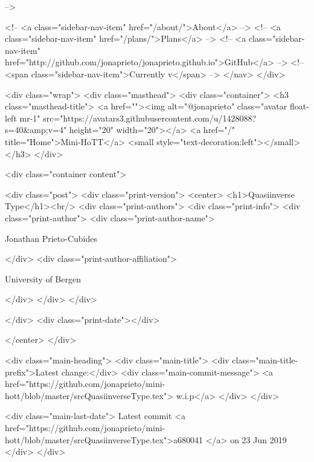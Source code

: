       
     -->

    <!-- <a class="sidebar-nav-item" href="/about/">About</a> -->
    <!-- <a class="sidebar-nav-item" href="/plans/">Plans</a> -->
    <!-- <a class="sidebar-nav-item" href="http://github.com/jonaprieto/jonaprieto.github.io">GitHub</a> -->
    <!-- <span class="sidebar-nav-item">Currently v</span> -->
  </nav>
</div>

    <div class="wrap">
      <div class="masthead">
        <div class="container">
          <h3 class="masthead-title">
            <a href=""><img alt="@jonaprieto" class="avatar float-left mr-1" src="https://avatars3.githubusercontent.com/u/1428088?s=40&amp;v=4" height="20" width="20"></a>
            <a href="/" title="Home">Mini-HoTT</a>
            <small style="text-decoration:left"></small>
          </h3>
        </div>
      
      <div class="container content">
        







<div class="post">
  <div class="print-version">
    <center>
      <h1>Quasiinverse Type</h1><br/>
        <div class="print-authors">
          <div class="print-info">
            <div class="print-author">
              <div class="print-author-name">
                
                  Jonathan Prieto-Cubides
                
              </div>
              <div class="print-author-affiliation">
                
                  University of Bergen
                
                </div>
            </div>
          </div>
          
          
        </div>
        <div class="print-date"></div>
        
        
    </center>
  </div>

  
  <div class="main-heading">
    <div class="main-title">
      <div class="main-title-prefix">Latest change:</div>
      <div class="main-commit-message">
            <a href="https://github.com/jonaprieto/mini-hott/blob/master/srcQuasiinverseType.tex">
              w.i.p</a>
      </div>
    </div>

    <div class="main-last-date">
      Latest commit <a href="https://github.com/jonaprieto/mini-hott/blob/master/srcQuasiinverseType.tex">a680041 </a> on  23 Jun 2019
    </div>
  </div>
  

